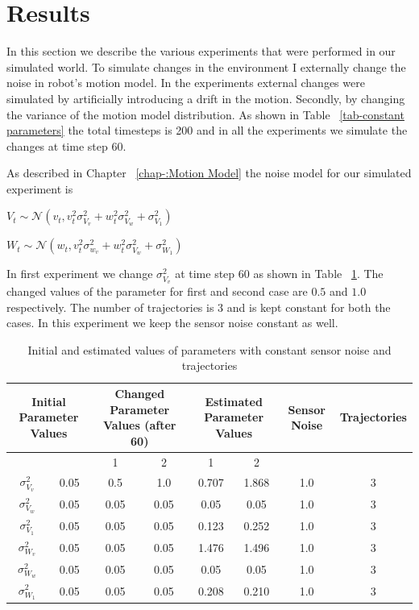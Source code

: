 \documentclass[12pt,draft]{dalcsthesis}
\begin{document}
\section{Results}
In this section we describe the various experiments that were performed in our simulated world. To simulate changes in the environment I externally change the noise in robot's motion model. In the experiments external changes were simulated by artificially introducing a drift in the motion. Secondly, by changing the variance of the motion model distribution. As shown in Table ~\ref{tab-constant parameters} the total timesteps is 200 and in all the experiments we simulate the changes at time step 60. 

As described in Chapter ~\ref{chap-:Motion Model} the noise model for our simulated experiment is 

$V_{t}\sim\mathcal{{N}}(v_{t},v_{t}^{2}\sigma_{V_{v}}^{2}+w_{t}^{2}\sigma_{V_{w}}^{2}+\sigma_{V_{1}}^{2})$

$W_{t}\sim\mathcal{{N}}(w_{t},v_{t}^{2}\sigma_{w_{v}}^{2}+w_{t}^{2}\sigma_{V_{w}}^{2}+\sigma_{W_{1}}^{2})$

In first experiment we change $\sigma_{V_{v}}^2$ at time step 60 as shown in Table ~\ref{tab-:varying_sensor_noise}. The changed values of the parameter for first and second case are $0.5$ and $1.0$ respectively. The number of trajectories is 3 and is kept constant for both the cases. In this experiment we keep the sensor noise constant as well. 

\begin{table}[tbh]

\centering



\begin{tabular}{|c|c|c|c|c|c|c|c|}
\hline 
\multicolumn{2}{|c|}{Initial Parameter Values} & \multicolumn{2}{c|}{Changed Parameter Values (after 60)} & \multicolumn{2}{c|}{Estimated Parameter Values} & Sensor Noise & Trajectories\tabularnewline
\hline 
 &  & 1 & 2 & 1 & 2 &  & \tabularnewline
\hline 
$\sigma_{V_{v}}^{2}$ & 0.05 & 0.5 & 1.0 & 0.707 & 1.868 & 1.0 & 3\tabularnewline
\hline 
$\sigma_{V_{w}}^{2}$ & 0.05 & 0.05 & 0.05 & 0.05 & 0.05 & 1.0 & 3\tabularnewline
\hline 
$\sigma_{V_{1}}^{2}$ & 0.05 & 0.05 & 0.05 & 0.123 & 0.252 & 1.0 & 3\tabularnewline
\hline 
$\sigma_{W_{v}}^{2}$ & 0.05 & 0.05 & 0.05 & 1.476 & 1.496 & 1.0 & 3\tabularnewline
\hline 
$\sigma_{W_{w}}^{2}$ & 0.05 & 0.05 & 0.05 & 0.05 & 0.05 & 1.0 & 3\tabularnewline
\hline 
$\sigma_{W_{1}}^{2}$ & 0.05 & 0.05 & 0.05 & 0.208 & 0.210 & 1.0 & 3\tabularnewline
\hline 
\end{tabular}
\caption{\label{tab-:varying_sensor_noise}Initial and estimated values of parameters with constant sensor noise
and trajectories}
\end{table}
\end{document}
